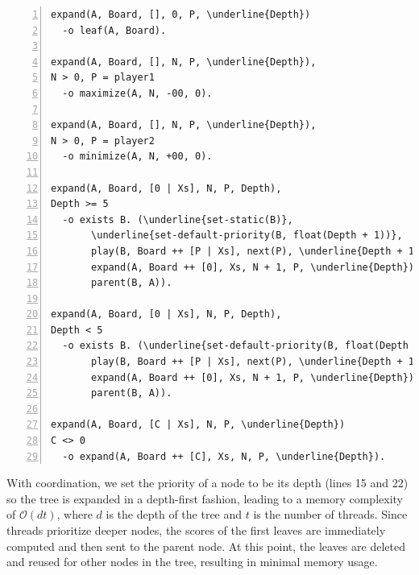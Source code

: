 \begin{topfig}
\scriptsize\begin{Verbatim}[numbers=left,commandchars=\\\{\}]
expand(A, Board, [], 0, P, \underline{Depth})
  -o leaf(A, Board).

expand(A, Board, [], N, P, \underline{Depth}),
N > 0, P = player1
  -o maximize(A, N, -00, 0).

expand(A, Board, [], N, P, \underline{Depth}),
N > 0, P = player2
  -o minimize(A, N, +00, 0).

expand(A, Board, [0 | Xs], N, P, Depth),
Depth >= 5
  -o exists B. (\underline{set-static(B)},
       \underline{set-default-priority(B, float(Depth + 1))},
       play(B, Board ++ [P | Xs], next(P), \underline{Depth + 1}),
       expand(A, Board ++ [0], Xs, N + 1, P, \underline{Depth}),
       parent(B, A)).

expand(A, Board, [0 | Xs], N, P, Depth),
Depth < 5
  -o exists B. (\underline{set-default-priority(B, float(Depth + 1))},
       play(B, Board ++ [P | Xs], next(P), \underline{Depth + 1}),
       expand(A, Board ++ [0], Xs, N + 1, P, \underline{Depth}),
       parent(B, A)).

expand(A, Board, [C | Xs], N, P, \underline{Depth})
C <> 0
  -o expand(A, Board ++ [C], Xs, N, P, \underline{Depth}).
\end{Verbatim}
\vspace*{-2ex}
\end{topfig}
\normalsize

With coordination, we set the priority of a node to be its depth (lines 15 and
22) so the tree is expanded in a depth-first fashion,
leading to a memory complexity of $\mathcal{O}(d t)$, where $d$
is the depth of the tree and $t$ is the number of threads.
Since threads prioritize deeper nodes, the scores of the first leaves are immediately
computed and then sent to the parent node. At this point, the leaves are deleted
and reused for other nodes in the tree, resulting in minimal memory usage.

